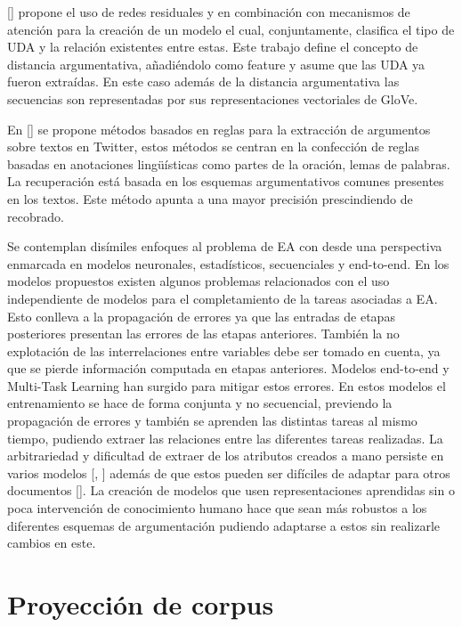 [\cite{galassi2021deep}] propone el uso de redes residuales y en combinación con mecanismos de atención
para la creación de un modelo el cual, conjuntamente, clasifica el tipo de UDA y la relación existentes entre estas.
Este trabajo define el concepto de distancia argumentativa, añadiéndolo como feature y asume que las UDA ya fueron 
extraídas. En este caso además de la distancia argumentativa las secuencias son representadas por sus representaciones
vectoriales de GloVe.

En [\cite{dykes2020reconstructing}] se propone métodos basados en reglas para la extracción de argumentos sobre
textos en Twitter, estos métodos se centran en la confección de reglas basadas en anotaciones lingüísticas como
partes de la oración, lemas de palabras. La recuperación está basada en los esquemas argumentativos comunes presentes
en los textos. Este método apunta a una mayor precisión prescindiendo de recobrado. 

Se contemplan disímiles enfoques al problema de EA con desde una perspectiva enmarcada en modelos neuronales, estadísticos, secuenciales y end-to-end. 
En los modelos propuestos existen algunos problemas relacionados con
el uso independiente de modelos para el completamiento de la tareas asociadas a EA. Esto conlleva a la propagación
de errores ya que las entradas de etapas posteriores presentan las errores de las etapas anteriores.
También la no explotación de las interrelaciones entre variables debe ser tomado en cuenta, ya que se pierde
información computada en etapas anteriores. Modelos end-to-end y 
Multi-Task Learning han surgido para mitigar estos errores. En estos modelos el entrenamiento se hace de forma 
conjunta y no secuencial, previendo la propagación de errores y también se aprenden las distintas tareas al mismo
tiempo, pudiendo extraer las relaciones entre las diferentes tareas realizadas.
La arbitrariedad y dificultad de extraer de los atributos creados a mano persiste en varios modelos [\cite{goudas2015argument}, \cite{palau2009argumentation}]
además de que estos pueden ser difíciles de adaptar para otros documentos [\cite{eger2017neural}].
La creación de modelos que usen representaciones aprendidas sin o poca intervención de conocimiento humano hace 
que sean más robustos a los diferentes esquemas de argumentación pudiendo adaptarse a estos sin 
realizarle cambios en este.

\section{Proyección de corpus}

